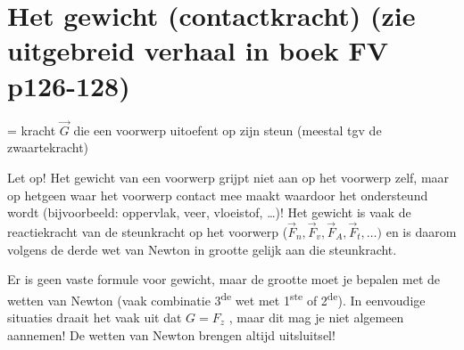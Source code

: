 \documentclass{ximera}
\begin{document}
\section*{Het gewicht (contactkracht) (zie uitgebreid verhaal in boek FV p126-128)}

= kracht \(\overrightarrow{G}\) die een voorwerp uitoefent op zijn steun
(meestal tgv de zwaartekracht)

Let op! Het gewicht van een voorwerp grijpt niet aan op het voorwerp zelf, maar op hetgeen waar het voorwerp contact mee maakt waardoor het ondersteund wordt (bijvoorbeeld: oppervlak, veer, vloeistof, \ldots)! Het gewicht is vaak de reactiekracht van de steunkracht op het voorwerp (\({\overrightarrow{F}}_{n},{\overrightarrow{F}}_{v},{\overrightarrow{F}}_{A},{\overrightarrow{F}}_{t},\ldots)\) en is daarom volgens de derde wet van Newton in grootte gelijk aan die steunkracht.

Er is geen vaste formule voor gewicht, maar de grootte moet je bepalen met de wetten van Newton (vaak combinatie 3\textsuperscript{de} wet met 1\textsuperscript{ste} of 2\textsuperscript{de}). 
In eenvoudige situaties draait het vaak uit dat \(G = F_{z}\) , maar dit mag je niet algemeen aannemen! De wetten van Newton brengen altijd uitsluitsel!
\end{document}
